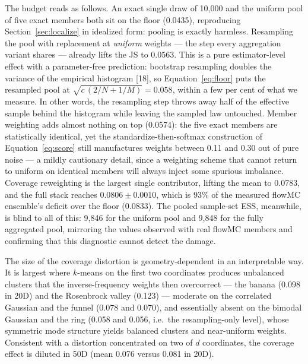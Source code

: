 \documentclass[11pt]{article}
\begin{document}
The budget reads as follows. An exact single draw of 10{,}000 and the uniform
pool of five exact members both sit on the floor (0.0435), reproducing
Section~\ref{sec:localize} in idealized form: pooling is exactly harmless.
Resampling the pool with replacement at \emph{uniform} weights --- the step
every aggregation variant shares --- already lifts the JS to $0.0563$. This is
a pure estimator-level effect with a parameter-free prediction: bootstrap
resampling doubles the variance of the empirical histogram [18], so
Equation~\eqref{eq:floor} puts the resampled pool at
$\sqrt{c\,(2/N+1/M)}=0.058$, within a few per cent of what we measure. In
other words, the resampling step throws away half of the effective sample
behind the histogram while leaving the sampled law untouched. Member weighting
adds almost nothing on top (0.0574): the five exact members are statistically
identical, yet the standardize-then-softmax construction of
Equation~\eqref{eq:score} still manufactures weights between 0.11 and 0.30
out of pure noise --- a mildly cautionary detail, since a weighting scheme
that cannot return to uniform on identical members will always inject some
spurious imbalance. Coverage reweighting is the largest single contributor,
lifting the mean to 0.0783, and the full stack reaches
$0.0806\pm0.0010$, which is 93\% of the measured flowMC ensemble's deficit
over the floor ($0.0833$). The pooled sample-set ESS, meanwhile, is blind to
all of this: 9{,}846 for the uniform pool and 9{,}848 for the fully aggregated
pool, mirroring the values observed with real flowMC members and confirming
that this diagnostic cannot detect the damage.

The size of the coverage distortion is geometry-dependent in an
interpretable way. It is largest where $k$-means on the first two coordinates
produces unbalanced clusters that the inverse-frequency weights then
overcorrect --- the banana (0.098 in 20D) and the Rosenbrock valley (0.123)
--- moderate on the correlated Gaussian and the funnel (0.078 and 0.070), and
essentially absent on the bimodal Gaussian and the ring (0.058 and 0.056,
i.e.\ the resampling-only level), whose symmetric mode structure yields
balanced clusters and near-uniform weights. Consistent with a distortion
concentrated on two of $d$ coordinates, the coverage effect is diluted in
50D (mean 0.076 versus 0.081 in 20D).
\end{document}
